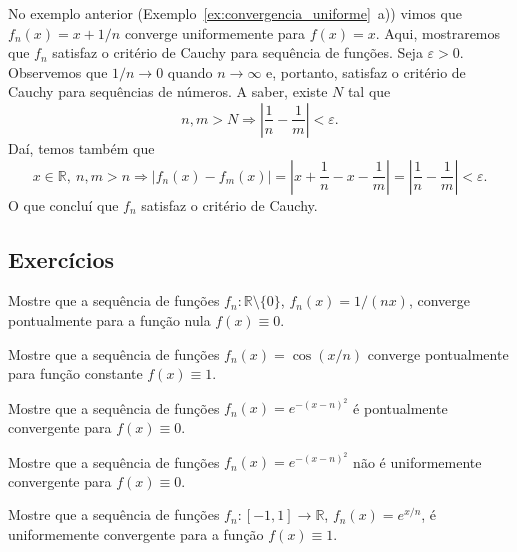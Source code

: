 \begin{ex}
  No exemplo anterior (Exemplo~\ref{ex:convergencia_uniforme}~a)) vimos que $f_n(x) = x + 1/n$ converge uniformemente para $f(x) = x$. Aqui, mostraremos que $f_n$ satisfaz o critério de Cauchy para sequência de funções.
  Seja $\varepsilon>0$. Observemos que $1/n\to 0$ quando $n\to \infty$ e, portanto, satisfaz o critério de Cauchy para sequências de números. A saber, existe $N$ tal que
  \begin{equation}
    n,m > N \Rightarrow \left|\frac{1}{n} - \frac{1}{m}\right| < \varepsilon.
  \end{equation}
  Daí, temos também que
  \begin{equation}
    x\in\mathbb{R}, ~n,m>n \Rightarrow |f_n(x) - f_m(x)| = \left|x+\frac{1}{n} - x - \frac{1}{m}\right| = \left|\frac{1}{n} - \frac{1}{m}\right| < \varepsilon.
  \end{equation}
O que concluí que $f_n$ satisfaz o critério de Cauchy.
\end{ex}

\subsection*{Exercícios}

\begin{exer}
  Mostre que a sequência de funções $f_n:\mathbb{R}\setminus \{0\}$, $f_n(x) = 1/(nx)$, converge pontualmente para a função nula $f(x) \equiv 0$.
\end{exer}

\begin{exer}
  Mostre que a sequência de funções $f_n(x) = \cos(x/n)$ converge pontualmente para função constante $f(x)\equiv 1$.
\end{exer}

\begin{exer}
  Mostre que a sequência de funções $f_n(x) = e^{-(x-n)^2}$ é pontualmente convergente para $f(x)\equiv 0$.
\end{exer}

\begin{exer}
  Mostre que a sequência de funções $f_n(x) = e^{-(x-n)^2}$ não é uniformemente convergente para $f(x)\equiv 0$.
\end{exer}

\begin{exer}
  Mostre que a sequência de funções $f_n:[-1, 1]\to\mathbb{R}$, $f_n(x) = e^{x/n}$, é uniformemente convergente para a função $f(x)\equiv 1$.
\end{exer}

